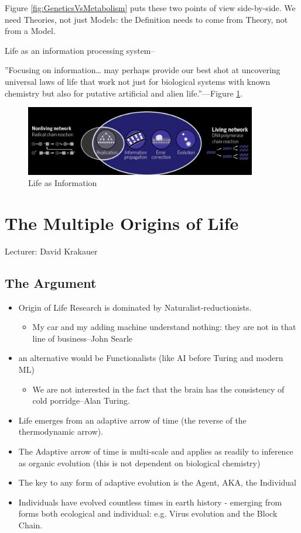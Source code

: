 \documentclass[]{article}
\begin{document}
Figure \ref{fig:GeneticsVsMetabolism} puts these two points of view side-by-side. We need Theories, not just Models: the Definition needs to come from Theory, not from a Model.

Life as an information processing system--\cite{nurse2008life}

''Focusing on information… may perhaps provide our best shot at uncovering universal laws of life that work not just for biological systems with known chemistry but also for putative artificial and alien life.''--\cite{cronin2016beyond}--Figure \ref{fig:LifeInformation}.

\begin{figure}[H]
	\caption{Life as Information}\label{fig:LifeInformation}
	\includegraphics[width=0.9\textwidth]{LifeInformation}
\end{figure}


\section{The Multiple Origins of Life}

Lecturer: David Krakauer

\subsection{The Argument}

\begin{itemize}
	\item Origin of Life Research is dominated by Naturalist-reductionists.
	\begin{itemize}
		\item My car and my adding machine 	understand nothing: they are
		not in that line of business--John Searle
	\end{itemize}
	\item an alternative would be Functionalists (like AI before Turing and modern ML)
	\begin{itemize}
		\item We are not interested in the fact that the brain has the consistency of cold porridge--Alan Turing.
	\end{itemize}
	\item Life emerges from an adaptive arrow of time (the reverse of the thermodynamic arrow).
	\item The Adaptive arrow of time is multi-scale and applies as readily to inference as organic evolution (this is not dependent on biological chemistry)
	\item The key to any form of adaptive evolution is the Agent, AKA, the Individual
	\item Individuals have evolved countless times in earth history - emerging from
	forms both ecological and individual: e.g. Virus evolution and the Block Chain.
\end{itemize}
\end{document}
